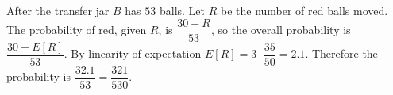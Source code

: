 After the transfer jar $B$ has $53$ balls. Let $R$ be the number of red balls moved. The probability of red, given $R$, is $\dfrac{30+R}{53}$, so the overall probability is $\dfrac{30+E[R]}{53}$. By linearity of expectation $E[R]=3\cdot\dfrac{35}{50}=2.1$. Therefore the probability is $\dfrac{32.1}{53}=\boxed{\dfrac{321}{530}}$.
